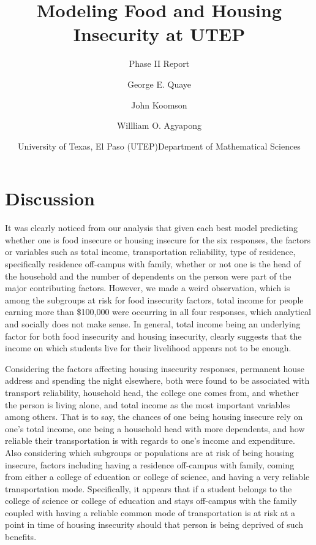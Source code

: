 \documentclass[
  10pt,
]{article}
\title{Modeling Food and Housing Insecurity at UTEP}
\subtitle{Phase II Report}
\author{George E. Quaye \and John Koomson \and Willliam O. Agyapong}
\date{\center University of Texas, El Paso (UTEP)\center \center Department of Mathematical Sciences \center}
\begin{document}
\maketitle

{
\hypersetup{linkcolor=}
\setcounter{tocdepth}{4}
\tableofcontents
}
\hypertarget{discussion}{%
\section{Discussion}\label{discussion}}

It was clearly noticed from our analysis that given each best model predicting whether one is food insecure or housing insecure for the six responses, the factors or variables such as total income, transportation reliability, type of residence, specifically residence off-campus with family, whether or not one is the head of the household and the number of dependents on the person were part of the major contributing factors. However, we made a weird observation, which is among the subgroups at risk for food insecurity factors, total income for people earning more than \$100,000 were occurring in all four responses, which analytical and socially does not make sense. In general, total income being an underlying factor for both food insecurity and housing insecurity, clearly suggests that the income on which students live for their livelihood appears not to be enough.

Considering the factors affecting housing insecurity responses, permanent house address and spending the night elsewhere, both were found to be associated with transport reliability, household head, the college one comes from, and whether the person is living alone, and total income as the most important variables among others. That is to say, the chances of one being housing insecure rely on one's total income, one being a household head with more dependents, and how reliable their transportation is with regards to one's income and expenditure. Also considering which subgroups or populations are at risk of being housing insecure, factors including having a residence off-campus with family, coming from either a college of education or college of science, and having a very reliable transportation mode. Specifically, it appears that if a student belongs to the college of science or college of education and stays off-campus with the family coupled with having a reliable common mode of transportation is at risk at a point in time of housing insecurity should that person is being deprived of such benefits.
\end{document}
